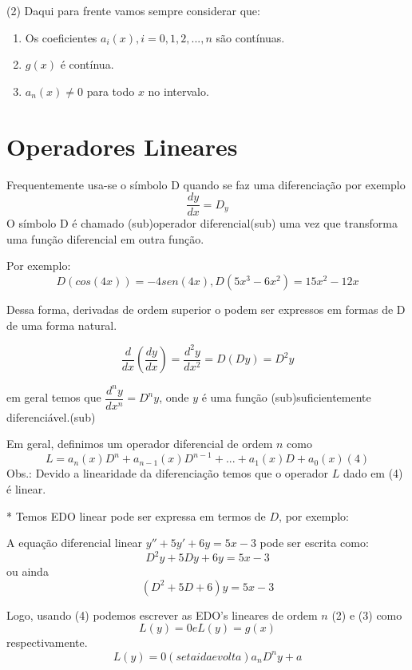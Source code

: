 (2) Daqui para frente vamos sempre considerar que:
\begin{enumerate}
	\item Os coeficientes $a_i(x), i=0,1,2,...,n$ são contínuas.
	\item $g(x)$ é contínua.
	\item $a_n(x) \neq 0$ para todo $x$ no intervalo.
\end{enumerate}

\section{Operadores Lineares}
Frequentemente usa-se o símbolo D quando se faz uma diferenciação por exemplo $$\dfrac{dy}{dx}=D_y$$ O símbolo D é chamado (sub)operador diferencial(sub) uma vez que transforma uma função diferencial em outra função.

Por exemplo: $$D(cos(4x))=-4sen(4x), D(5x^3-6x^2)=15x^2-12x$$

Dessa forma, derivadas de ordem superior o podem ser expressos em formas de D de uma forma natural.

$$\dfrac{d}{dx}(\dfrac{dy}{dx})=\dfrac{d^2y}{dx^2}=D(Dy)=D^2y$$

em geral temos que $\dfrac{d^ny}{dx^n}=D^ny$, onde $y$ é uma função (sub)suficientemente diferenciável.(sub)

Em geral, definimos um operador diferencial de ordem $n$ como $$L = a_n(x)D^n+a_{n-1}(x)D^{n-1}+...+a_1(x)D+a_0(x) (4)$$ Obs.: Devido a linearidade da diferenciação temos que o operador $L$ dado em (4) é linear.

* Temos EDO linear pode ser expressa em termos de $D$, por exemplo:

A equação diferencial linear $y''+5y'+6y=5x-3$ pode ser escrita como: $$D^2y+5Dy+6y=5x-3$$ ou ainda $$(D^2+5D+6)y=5x-3$$

Logo, usando (4) podemos escrever as EDO's lineares de ordem $n$ (2) e (3) como $$L(y)=0 e L(y)=g(x)$$ respectivamente.
$$L(y)=0(seta ida e volta)a_nD^ny+a$$